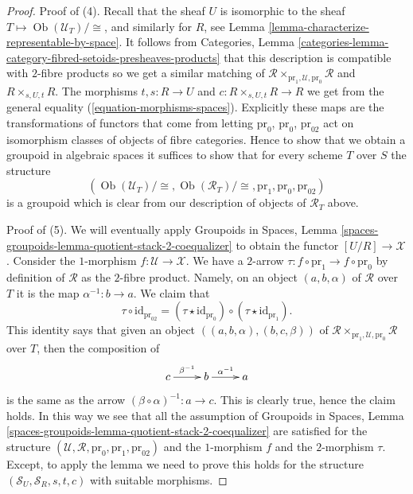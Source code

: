 \documentclass{stacks-project}
\theoremstyle{plain}
\theoremstyle{definition}
\theoremstyle{remark}
\numberwithin{equation}{subsection}
\def\Ob{\mathop{\mathrm{Ob}}\nolimits}
\begin{document}
\begin{proof}
\medskip\noindent
Proof of (4). Recall that the sheaf $U$ is isomorphic to the sheaf
$T \mapsto \Ob(\mathcal{U}_T)/\!\cong$, and
similarly for $R$, see
Lemma \ref{lemma-characterize-representable-by-space}.
It follows from
Categories,
Lemma \ref{categories-lemma-category-fibred-setoids-presheaves-products}
that this description is compatible with $2$-fibre products
so we get a similar matching of
$\mathcal{R} \times_{\text{pr}_1, \mathcal{U}, \text{pr}_0} \mathcal{R}$
and $R \times_{s, U, t} R$.
The morphisms $t, s : R \to U$ and $c : R \times_{s, U, t} R \to R$
we get from the general equality (\ref{equation-morphisms-spaces}).
Explicitly these maps are the transformations of functors that come
from letting $\text{pr}_0$, $\text{pr}_0$, $\text{pr}_{02}$
act on isomorphism classes of objects of fibre categories.
Hence to show that we obtain a groupoid in algebraic
spaces it suffices to show that for every scheme $T$ over $S$
the structure
$$
(\Ob(\mathcal{U}_T)/\!\cong,
\Ob(\mathcal{R}_T)/\!\cong,
\text{pr}_1, \text{pr}_0, \text{pr}_{02})
$$
is a groupoid which is clear from our description of objects of
$\mathcal{R}_T$ above.

\medskip\noindent
Proof of (5). We will eventually apply
Groupoids in Spaces,
Lemma \ref{spaces-groupoids-lemma-quotient-stack-2-coequalizer}
to obtain the functor $[U/R] \to \mathcal{X}$.
Consider the $1$-morphism $f : \mathcal{U} \to \mathcal{X}$.
We have a $2$-arrow $\tau : f \circ \text{pr}_1 \to f \circ \text{pr}_0$
by definition of $\mathcal{R}$ as the $2$-fibre product.
Namely, on an object $(a, b, \alpha)$ of $\mathcal{R}$ over $T$ it is
the map $\alpha^{-1} : b \to a$. We claim that
$$
\tau \circ \text{id}_{\text{pr}_{02}} =
(\tau \star \text{id}_{\text{pr}_0})
\circ
(\tau \star \text{id}_{\text{pr}_1}).
$$
This identity says that given an object
$((a, b, \alpha), (b, c, \beta))$ of
$\mathcal{R} \times_{\text{pr}_1, \mathcal{U}, \text{pr}_0} \mathcal{R}$
over $T$, then the composition of
$$
\xymatrix{
c \ar[r]^{\beta^{-1}} & b \ar[r]^{\alpha^{-1}} & a
}
$$
is the same as the arrow $(\beta \circ \alpha)^{-1} : a \to c$. This is
clearly true, hence the claim holds. In this way we see that all the
assumption of
Groupoids in Spaces,
Lemma \ref{spaces-groupoids-lemma-quotient-stack-2-coequalizer}
are satisfied for the structure
$(\mathcal{U}, \mathcal{R}, \text{pr}_0, \text{pr}_1, \text{pr}_{02})$
and the $1$-morphism $f$ and the $2$-morphism $\tau$.
Except, to apply the lemma we need to prove this holds
for the structure $(\mathcal{S}_U, \mathcal{S}_R, s, t, c)$
with suitable morphisms.


\end{proof}
\end{document}
